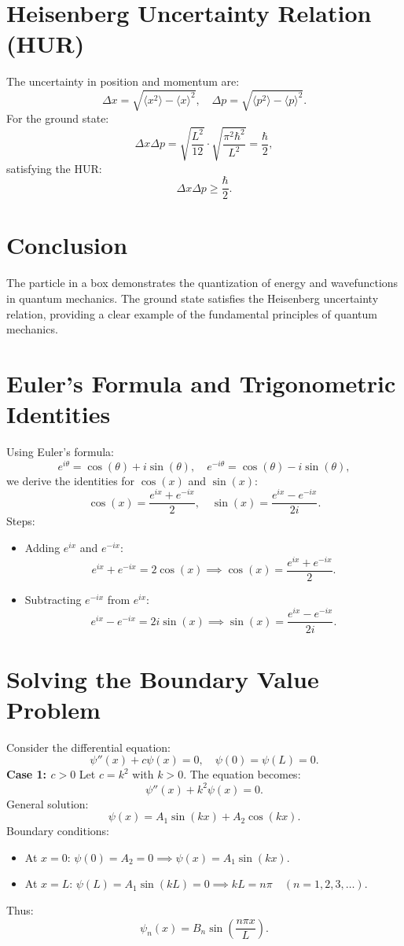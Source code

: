 \documentclass[a4paper,12pt]{article}
\begin{document}
\begin{multicols}{2}
\section*{Heisenberg Uncertainty Relation (HUR)}
The uncertainty in position and momentum are:
\[
\Delta x = \sqrt{\langle x^2 \rangle - \langle x \rangle^2}, \quad \Delta p = \sqrt{\langle p^2 \rangle - \langle p \rangle^2}.
\]
For the ground state:
\[
\Delta x \Delta p = \sqrt{\frac{L^2}{12}} \cdot \sqrt{\frac{\pi^2 \hbar^2}{L^2}} = \frac{\hbar}{2},
\]
satisfying the HUR:
\[
\Delta x \Delta p \geq \frac{\hbar}{2}.
\]

\section*{Conclusion}
The particle in a box demonstrates the quantization of energy and wavefunctions in quantum mechanics. The ground state satisfies the Heisenberg uncertainty relation, providing a clear example of the fundamental principles of quantum mechanics.

\section*{Euler's Formula and Trigonometric Identities}
Using Euler's formula:
\[
e^{i\theta} = \cos(\theta) + i\sin(\theta), \quad e^{-i\theta} = \cos(\theta) - i\sin(\theta),
\]
we derive the identities for $\cos(x)$ and $\sin(x)$:
\[
\cos(x) = \frac{e^{ix} + e^{-ix}}{2}, \quad \sin(x) = \frac{e^{ix} - e^{-ix}}{2i}.
\]
Steps:
\begin{itemize}
    \item Adding $e^{ix}$ and $e^{-ix}$:
    \[
    e^{ix} + e^{-ix} = 2\cos(x) \implies \cos(x) = \frac{e^{ix} + e^{-ix}}{2}.
    \]
    \item Subtracting $e^{-ix}$ from $e^{ix}$:
    \[
    e^{ix} - e^{-ix} = 2i\sin(x) \implies \sin(x) = \frac{e^{ix} - e^{-ix}}{2i}.
    \]
\end{itemize}

\section*{Solving the Boundary Value Problem}
Consider the differential equation:
\[
\psi''(x) + c\psi(x) = 0, \quad \psi(0) = \psi(L) = 0.
\]
\textbf{Case 1: $c > 0$}  
Let $c = k^2$ with $k > 0$. The equation becomes:
\[
\psi''(x) + k^2\psi(x) = 0.
\]
General solution:
\[
\psi(x) = A_1\sin(kx) + A_2\cos(kx).
\]
Boundary conditions:
\begin{itemize}
    \item At $x=0$: $\psi(0) = A_2 = 0 \implies \psi(x) = A_1\sin(kx)$.
    \item At $x=L$: $\psi(L) = A_1\sin(kL) = 0 \implies kL = n\pi \quad (n=1, 2, 3, \dots)$.
\end{itemize}
Thus:
\[
\psi_n(x) = B_n\sin\left(\frac{n\pi x}{L}\right).
\]


\end{multicols}
\end{document}
